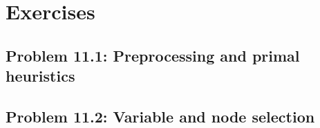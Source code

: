 \pagebreak

\section{Exercises}


\subsection*{Problem 11.1: Preprocessing and primal heuristics}


\subsection*{Problem 11.2: Variable and node selection}






